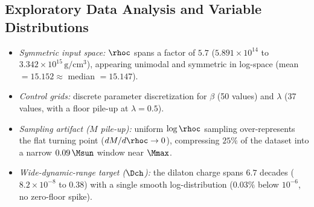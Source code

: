 \subsection{Exploratory Data Analysis and Variable Distributions}
\label{sec:eda}

\begin{itemize}
  \item \textit{Symmetric input space:} $\rhoc$ spans a factor of $5.7$ ($5.891\times 10^{14}$ to $3.342\times 10^{15}\,\mathrm{g/cm^3}$), appearing unimodal and symmetric in log-space (mean $= 15.152 \approx$ median $= 15.147$).
  \item \textit{Control grids:} discrete parameter discretization for $\beta$ (50 values) and $\lambda$ (37 values, with a floor pile-up at $\lambda = 0.5$).
  \item \textit{Sampling artifact ($M$ pile-up):} uniform $\log\rhoc$ sampling over-represents the flat turning point ($dM/d\rhoc \to 0$), compressing $25\%$ of the dataset into a narrow $0.09\,\Msun$ window near $\Mmax$.
  \item \textit{Wide-dynamic-range target ($\Dch$):} the dilaton charge spans $6.7$ decades ($8.2\times 10^{-8}$ to $0.38$) with a single smooth log-distribution ($0.03\%$ below $10^{-6}$, no zero-floor spike).
\end{itemize}
